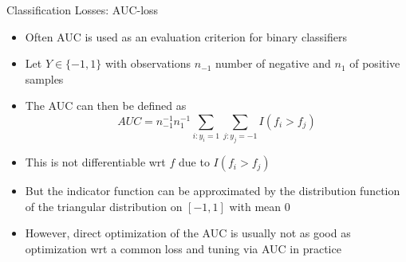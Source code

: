\begin{vbframe}{Classification Losses: AUC-loss}

\begin{itemize}
\item Often AUC is used as an evaluation criterion for binary classifiers
\item Let $Y \in \{-1, 1\}$ with observations $n_{-1}$ number of negative and $n_{1}$ of positive samples %
\item The AUC can then be defined as
$$AUC = n_{-1}^{-1} n_1^{-1} \sum_{i: y_i = 1} \sum_{j: y_j = -1} I(f_i > f_j)$$
\item This is not differentiable wrt $f$ due to $I(f_i > f_j)$
\item But the indicator function can be approximated by the distribution function of the triangular distribution on $[-1, 1]$ with mean $0$
\item However, direct optimization of the AUC is usually not as good as optimization wrt a common loss and tuning via AUC in practice 

\end{itemize}
\end{vbframe}





\endlecture

